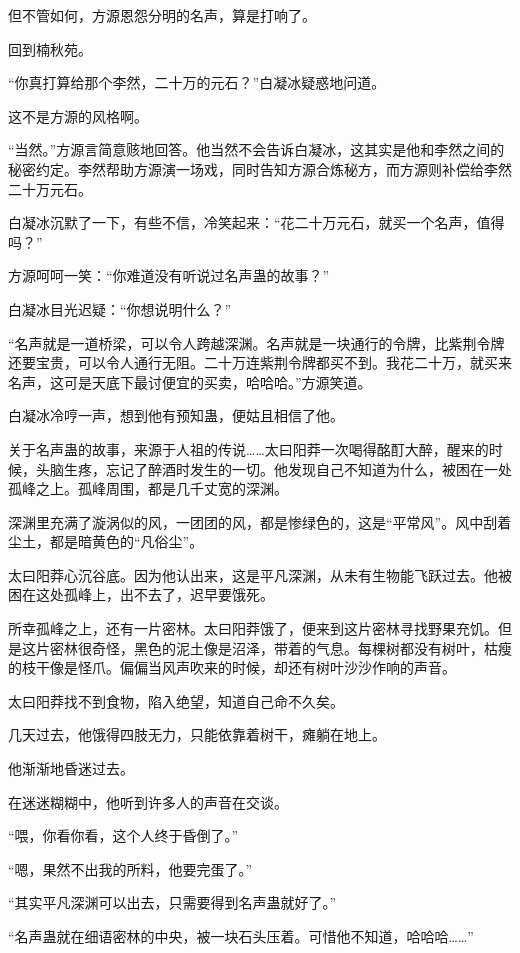 \begin{this_body}
但不管如何，方源恩怨分明的名声，算是打响了。

回到楠秋苑。

“你真打算给那个李然，二十万的元石？”白凝冰疑惑地问道。

这不是方源的风格啊。

“当然。”方源言简意赅地回答。他当然不会告诉白凝冰，这其实是他和李然之间的秘密约定。李然帮助方源演一场戏，同时告知方源合炼秘方，而方源则补偿给李然二十万元石。

白凝冰沉默了一下，有些不信，冷笑起来：“花二十万元石，就买一个名声，值得吗？”

方源呵呵一笑：“你难道没有听说过名声蛊的故事？”

白凝冰目光迟疑：“你想说明什么？”

“名声就是一道桥梁，可以令人跨越深渊。名声就是一块通行的令牌，比紫荆令牌还要宝贵，可以令人通行无阻。二十万连紫荆令牌都买不到。我花二十万，就买来名声，这可是天底下最讨便宜的买卖，哈哈哈。”方源笑道。

白凝冰冷哼一声，想到他有预知蛊，便姑且相信了他。

关于名声蛊的故事，来源于人祖的传说……太曰阳莽一次喝得酩酊大醉，醒来的时候，头脑生疼，忘记了醉酒时发生的一切。他发现自己不知道为什么，被困在一处孤峰之上。孤峰周围，都是几千丈宽的深渊。

深渊里充满了漩涡似的风，一团团的风，都是惨绿色的，这是“平常风”。风中刮着尘土，都是暗黄色的“凡俗尘”。

太曰阳莽心沉谷底。因为他认出来，这是平凡深渊，从未有生物能飞跃过去。他被困在这处孤峰上，出不去了，迟早要饿死。

所幸孤峰之上，还有一片密林。太曰阳莽饿了，便来到这片密林寻找野果充饥。但是这片密林很奇怪，黑色的泥土像是沼泽，带着的气息。每棵树都没有树叶，枯瘦的枝干像是怪爪。偏偏当风声吹来的时候，却还有树叶沙沙作响的声音。

太曰阳莽找不到食物，陷入绝望，知道自己命不久矣。

几天过去，他饿得四肢无力，只能依靠着树干，瘫躺在地上。

他渐渐地昏迷过去。

在迷迷糊糊中，他听到许多人的声音在交谈。

“喂，你看你看，这个人终于昏倒了。”

“嗯，果然不出我的所料，他要完蛋了。”

“其实平凡深渊可以出去，只需要得到名声蛊就好了。”

“名声蛊就在细语密林的中央，被一块石头压着。可惜他不知道，哈哈哈……”


\end{this_body}
